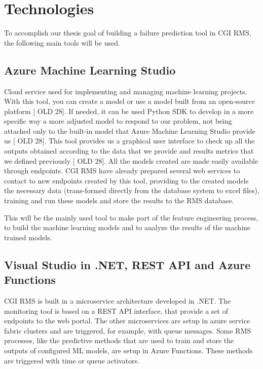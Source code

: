 


\chapter{Technologies}
\label{cha:introduction}

To accomplish our thesis goal of building a failure prediction tool in CGI RMS, the following main tools will be used.


\section{Azure Machine Learning Studio} 
\label{sub:if_you_use_this_template}

Cloud service used for implementing and managing machine learning projects. With this tool, you can create a model or use a model built from an open-source platform [ OLD 28].
If needed, it can be used Python SDK to develop in a more specific way a more adjusted model to respond to our problem, not being attached only to the built-in model that Azure Machine Learning Studio provide us [ OLD 28].
This tool provides us a graphical user interface to check up all the outputs obtained according to the data that we provide and results metrics that we defined previously [ OLD 28].
All the models created are made easily available through endpoints. CGI RMS have already prepared several web services to contact to new endpoints created by this tool, providing to the created models the necessary data (trans-formed directly from the database system to excel files), training and run these models and store the results to the RMS database.

This will be the mainly used tool to make part of the feature engineering process, to build the machine learning models and to analyze the results of the machine trained models.


\section{Visual Studio in .NET, REST API and Azure Functions} 
\label{sub:if_you_use_this_template}
CGI RMS is built in a microservice architecture developed in .NET. The monitoring tool is based on a REST API interface, that provide a set of endpoints to the web portal. The other microservices are setup in azure service fabric clusters and are triggered, for example, with queue messages. Some RMS processes, like the predictive methods that are used to train and store the outputs of configured ML models, are setup in Azure Functions. These methods are triggered with time or queue activators.

